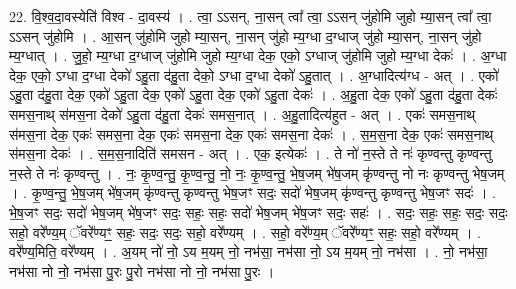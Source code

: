 \documentclass[17pt]{extarticle}
\begin{document}
22. वि॒श्व॒दा॒वस्येति॑ विश्व - दा॒वस्य॑ । . त्वा॒ ऽऽसन्, ना॒सन् त्वा᳚ त्वा॒ ऽऽसन् जु॑होमि जुहो म्या॒सन् त्वा᳚ त्वा॒ ऽऽसन् जु॑होमि । . आ॒सन् जु॑होमि जुहो म्या॒सन्, ना॒सन् जु॑हो म्य॒ग्धा द॒ग्धाज् जु॑हो म्या॒सन्, ना॒सन् जु॑हो म्य॒ग्धात् । . जु॒हो॒ म्य॒ग्धा द॒ग्धाज् जु॑होमि जुहो म्य॒ग्धा देक॒ एको॒ ऽग्धाज् जु॑होमि जुहो म्य॒ग्धा देकः॑ । . अ॒ग्धा देक॒ एको॒ ऽग्धा द॒ग्धा देको॑ ऽहु॒ता द॑हु॒ता देको॒ ऽग्धा द॒ग्धा देको॑ ऽहु॒तात् । . अ॒ग्धादित्य॑ग्ध - अत् । . एको॑ ऽहु॒ता द॑हु॒ता देक॒ एको॑ ऽहु॒ता देक॒ एको॑ ऽहु॒ता देक॒ एको॑ ऽहु॒ता देकः॑ । . अ॒हु॒ता देक॒ एको॑ ऽहु॒ता द॑हु॒ता देकः॑ समस॒नाथ् स॑मस॒ना देको॑ ऽहु॒ता द॑हु॒ता देकः॑ समस॒नात् । . अ॒हु॒तादित्य॑हुत - अत् । . एकः॑ समस॒नाथ् स॑मस॒ना देक॒ एकः॑ समस॒ना देक॒ एकः॑ समस॒ना देक॒ एकः॑ समस॒ना देकः॑ । . स॒म॒स॒ना देक॒ एकः॑ समस॒नाथ् स॑मस॒ना देकः॑ । . स॒म॒स॒नादिति॑ समसन - अत् । . एक॒ इत्येकः॑ । . ते नो॑ न॒स्ते ते नः॑ कृण्वन्तु कृण्वन्तु न॒स्ते ते नः॑ कृण्वन्तु । . नः॒ कृ॒ण्व॒न्तु॒ कृ॒ण्व॒न्तु॒ नो॒ नः॒ कृ॒ण्व॒न्तु॒ भे॒ष॒जम् भे॑ष॒जम् कृ॑ण्वन्तु नो नः कृण्वन्तु भेष॒जम् । . कृ॒ण्व॒न्तु॒ भे॒ष॒जम् भे॑ष॒जम् कृ॑ण्वन्तु कृण्वन्तु भेष॒जꣳ सदः॒ सदो॑ भेष॒जम् कृ॑ण्वन्तु कृण्वन्तु भेष॒जꣳ सदः॑ । . भे॒ष॒जꣳ सदः॒ सदो॑ भेष॒जम् भे॑ष॒जꣳ सदः॒ सहः॒ सहः॒ सदो॑ भेष॒जम् भे॑ष॒जꣳ सदः॒ सहः॑ । . सदः॒ सहः॒ सहः॒ सदः॒ सदः॒ सहो॒ वरे᳚ण्य॒म् ॅवरे᳚ण्यꣳ॒॒ सहः॒ सदः॒ सदः॒ सहो॒ वरे᳚ण्यम् । . सहो॒ वरे᳚ण्य॒म् ॅवरे᳚ण्यꣳ॒॒ सहः॒ सहो॒ वरे᳚ण्यम् । . वरे᳚ण्य॒मिति॒ वरे᳚ण्यम् । . अ॒यम् नो॑ नो॒ ऽय म॒यम् नो॒ नभ॑सा॒ नभ॑सा नो॒ ऽय म॒यम् नो॒ नभ॑सा । . नो॒ नभ॑सा॒ नभ॑सा नो नो॒ नभ॑सा पु॒रः पु॒रो नभ॑सा नो नो॒ नभ॑सा पु॒रः । \newline
\end{document}
